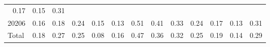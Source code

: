 \begin{table}[!h]
\begin{tabular}{lllllllllllll}
  \multicolumn{1}{r}{0.17} &
  \multicolumn{1}{r}{0.15} &
  \multicolumn{1}{r}{0.31} \\
\multicolumn{1}{l}{\hspace{1em}20206} &
  \multicolumn{1}{|r}{0.16} &
  \multicolumn{1}{r}{0.18} &
  \multicolumn{1}{r}{0.24} &
  \multicolumn{1}{r}{0.15} &
  \multicolumn{1}{r}{0.13} &
  \multicolumn{1}{r}{0.51} &
  \multicolumn{1}{r}{0.41} &
  \multicolumn{1}{r}{0.33} &
  \multicolumn{1}{r}{0.24} &
  \multicolumn{1}{r}{0.17} &
  \multicolumn{1}{r}{0.13} &
  \multicolumn{1}{r}{0.31} \\
\multicolumn{1}{l}{\hspace{1em}Total} &
  \multicolumn{1}{|r}{0.18} &
  \multicolumn{1}{r}{0.27} &
  \multicolumn{1}{r}{0.25} &
  \multicolumn{1}{r}{0.08} &
  \multicolumn{1}{r}{0.16} &
  \multicolumn{1}{r}{0.47} &
  \multicolumn{1}{r}{0.36} &
  \multicolumn{1}{r}{0.32} &
  \multicolumn{1}{r}{0.25} &
  \multicolumn{1}{r}{0.19} &
  \multicolumn{1}{r}{0.14} &
  \multicolumn{1}{r}{0.29} \\
\cline{1-13}
\end{tabular}
\end{table}
